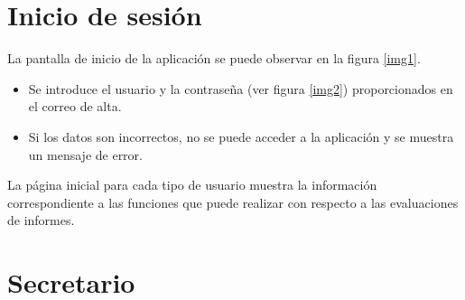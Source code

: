 \documentclass[12pt,a4paper,spanish,twoside]{book}
\begin{document}
\section{Inicio de sesión}
La pantalla de inicio de la aplicación se puede observar en la figura
\ref{img1}.


\begin{itemize}
\item Se introduce el usuario y la contraseña (ver figura \ref{img2})
  proporcionados en el correo de alta.


\item Si los datos son incorrectos, no se puede acceder a la aplicación y se
  muestra un mensaje de error. 
\end{itemize}

La página inicial para cada tipo de usuario muestra la información 
correspondiente a las funciones que puede realizar con respecto a las 
evaluaciones de informes.


\section{Secretario}
\end{document}
